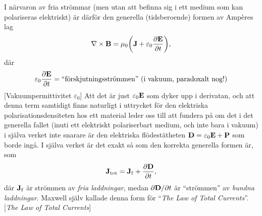 {{{{{I n{\"a}rvaron av fria str{\"o}mmar (men utan att befinna sig i ett medium som
kan polariseras elektriskt) {\"a}r d{\"a}rf{\"o}r den generella (tidsberoende)
formen av Amp{\`e}res lag
$$
  \nabla\times{\bf B}=\mu_0\bigg({\bf J}
    +\varepsilon_0{{\partial{\bf E}}\over{\partial t}}\bigg),
$$
d{\"a}r
$$
  \varepsilon_0{{\partial{\bf E}}\over{\partial t}}
    =\hbox{``f{\"o}rskjutningsstr{\"o}mmen'' (i vakuum, paradoxalt nog!)}
$$
[Vakuumpermittivitet $\varepsilon_0$]
Att det {\"a}r just $\varepsilon_0{\bf E}$ som dyker upp i derivatan, och att
denna term samtidigt finns naturligt i uttrycket f{\"o}r den elektriska
polarisationsdensiteten  hos
ett material leder oss
till att fundera p{\aa} om det i det generella fallet (inuti ett elektriskt
polariserbart medium, och inte bara i vakuum) i sj{\"a}lva verket inte
snarare {\"a}r den elektriska fl{\"o}dest{\"a}theten ${\bf D}=\varepsilon_0
{\bf E}+{\bf P}$ som borde ing{\aa}.
I sj{\"a}lva verket {\"a}r det exakt s{\aa} som den
korrekta generella formen {\"a}r, som
$$
  {\bf J}_{\rm tot} = {\bf J}_{\rm f}+{{\partial{\bf D}}\over{\partial t}},
$$
d{\"a}r ${\bf J}_{\rm f}$ {\"a}r str{\"o}mmen av {\it fria laddningar}, medan
${{\partial{\bf D}}/{\partial t}}$ {\"a}r ``str{\"o}mmen'' av {\it bundna
laddningar}. Maxwell sj{\"a}lv kallade denna form f{\"o}r ``{\it The Law of
Total Currents}''.
[{{\it The Law of Total Currents}}]

}}}}}

